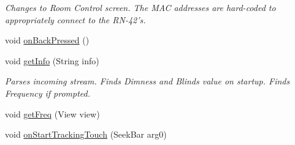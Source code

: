 \begin{DoxyCompactItemize}
\begin{DoxyCompactList}\small\item\em Changes to Room Control screen. The M\-A\-C addresses are hard-\/coded to appropriately connect to the R\-N-\/42's. \end{DoxyCompactList}\item 
void \hyperlink{classcom_1_1example_1_1android_1_1_bluetooth_chat_1_1_l_a_s_a_r_control_acb776333595cb036bf935852041cb088}{on\-Back\-Pressed} ()
\item 
void \hyperlink{classcom_1_1example_1_1android_1_1_bluetooth_chat_1_1_l_a_s_a_r_control_a3d586a7ab265876564fc5c288cb38e0d}{get\-Info} (String info)
\begin{DoxyCompactList}\small\item\em Parses incoming stream. Finds Dimness and Blinds value on startup. Finds Frequency if prompted. \end{DoxyCompactList}\item 
void \hyperlink{classcom_1_1example_1_1android_1_1_bluetooth_chat_1_1_l_a_s_a_r_control_adc846b4b8d9a9ee1e53b348432eb8aff}{get\-Freq} (View view)
\item 
void \hyperlink{classcom_1_1example_1_1android_1_1_bluetooth_chat_1_1_l_a_s_a_r_control_a281a2ae677c641ec8d556d283435bd40}{on\-Start\-Tracking\-Touch} (Seek\-Bar arg0)
\end{DoxyCompactItemize}
